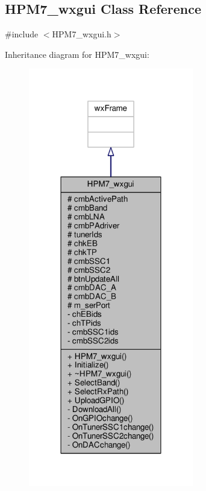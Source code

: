 \subsection{H\+P\+M7\+\_\+wxgui Class Reference}
\label{classHPM7__wxgui}


{\ttfamily \#include $<$H\+P\+M7\+\_\+wxgui.\+h$>$}



Inheritance diagram for H\+P\+M7\+\_\+wxgui\+:
\nopagebreak
\begin{figure}[H]
\begin{center}
\leavevmode
\includegraphics[width=204pt]{d4/d08/classHPM7__wxgui__inherit__graph}
\end{center}
\end{figure}


